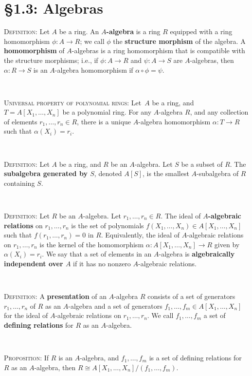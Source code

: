 \documentclass[12pt]{amsart}
\newcommand{\showsol}[1]{\def\displaysol{#1}}
\begin{document}
\showsol{0}
	
	\thispagestyle{empty}
	
	\section*{\S1.3: Algebras}	

\begin{framed}

\noindent \textsc{Definition:} Let $A$ be a ring. An \textbf{$A$-algebra} is a ring $R$ equipped with a ring homomorphism ${\phi:A\to R}$; we call $\phi$ the \textbf{structure morphism} of the algebra\footnotemark. A \textbf{homomorphism} of $A$-algebras is a ring homomorphism that is compatible with the structure morphisms; i.e., if $\phi:A\to R$ and $\psi:A\to S$ are $A$-algebras, then $\alpha:R\to S$ is an $A$-algebra homomorphism if $\alpha\circ \phi = \psi$.


\

\noindent \textsc{Universal property of polynomial rings:} Let\footnotemark \ $A$ be a ring, and $T=A[X_1,\dots,X_n]$ be a polynomial ring. For any $A$-algebra $R$, and any collection of elements $r_1,\dots,r_n\in R$, there is a unique $A$-algebra homomorphism $\alpha: T\to R$ such that $\alpha(X_i) = r_i$.


\


\noindent \textsc{Definition:} Let $A$ be a ring, and $R$ be an $A$-algebra. Let $S$ be a subset of $R$. The \textbf{subalgebra generated by $S$}, denoted $A[S]$, is the smallest $A$-subalgebra of $R$ containing $S$.

\


\noindent \textsc{Definition:} Let $R$ be an $A$-algebra. Let $r_1,\dots,r_n\in R$. The ideal of \textbf{$A$-algebraic relations} on $r_1,\dots,r_n$ is the set of polynomials $f(X_1,\dots,X_n)\in A[X_1,\dots,X_n]$ such that ${f(r_1,\dots,r_n)=0}$ in $R$. Equivalently, the ideal of $A$-algebraic relations on $r_1,\dots,r_n$ is the kernel of the homomorphism ${\alpha: A[X_1,\dots,X_n]\to R}$ given by $\alpha(X_i)=r_i$. We say that a set of elements in an $A$-algebra is \textbf{algebraically independent over $A$} if it has  no nonzero $A$-algebraic relations.

\

\noindent \textsc{Definition:} A \textbf{presentation} of an $A$-algebra $R$ consists of a set of generators $r_1,\dots,r_n$ of $R$ as an $A$-algebra and a set of generators $f_1,\dots,f_m\in A[X_1,\dots,X_n]$ for the ideal of $A$-algebraic relations on $r_1,\dots,r_n$. We call $f_1,\dots,f_m$ a set of \textbf{defining relations} for $R$ as an $A$-algebra.

\

\noindent \textsc{Proposition:} If $R$ is an $A$-algebra, and $f_1,\dots,f_m$ is a set of defining relations for $R$ as an $A$-algebra, then $R\cong A[X_1,\dots,X_n]/(f_1,\dots,f_m)$.

 
 \end{framed}
 
\end{document}
